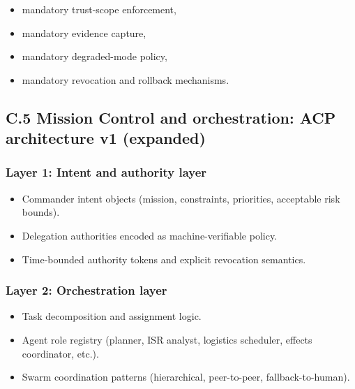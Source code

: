 \documentclass[
]{article}
\providecommand{\tightlist}{%
  \setlength{\itemsep}{0pt}\setlength{\parskip}{0pt}}
\begin{document}
\begin{itemize}
\tightlist
\item
  mandatory trust-scope enforcement,
\item
  mandatory evidence capture,
\item
  mandatory degraded-mode policy,
\item
  mandatory revocation and rollback mechanisms.
\end{itemize}

\hypertarget{c.5-mission-control-and-orchestration-acp-architecture-v1-expanded}{%
\subsection{C.5 Mission Control and orchestration: ACP architecture v1
(expanded)}\label{c.5-mission-control-and-orchestration-acp-architecture-v1-expanded}}

\hypertarget{layer-1-intent-and-authority-layer}{%
\subsubsection{Layer 1: Intent and authority
layer}\label{layer-1-intent-and-authority-layer}}

\begin{itemize}
\tightlist
\item
  Commander intent objects (mission, constraints, priorities, acceptable
  risk bounds).
\item
  Delegation authorities encoded as machine-verifiable policy.
\item
  Time-bounded authority tokens and explicit revocation semantics.
\end{itemize}

\hypertarget{layer-2-orchestration-layer}{%
\subsubsection{Layer 2: Orchestration
layer}\label{layer-2-orchestration-layer}}

\begin{itemize}
\tightlist
\item
  Task decomposition and assignment logic.
\item
  Agent role registry (planner, ISR analyst, logistics scheduler,
  effects coordinator, etc.).
\item
  Swarm coordination patterns (hierarchical, peer-to-peer,
  fallback-to-human).
\end{itemize}
\end{document}
